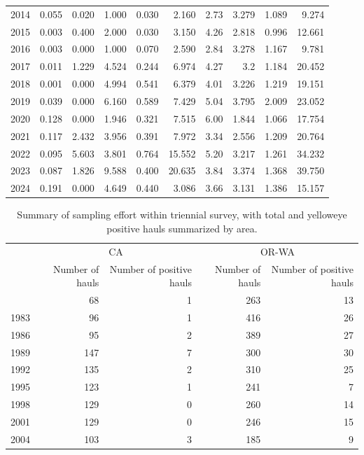 \documentclass[
]{scrartcl}
\begin{document}
\begin{landscape}
\begin{longtable}{rrrrrrrrrr}
2014 & 0.055 & 0.020 & 1.000 & 0.030 & 2.160 & 2.73 & 3.279 & 1.089 & 9.274 \\ 
2015 & 0.003 & 0.400 & 2.000 & 0.030 & 3.150 & 4.26 & 2.818 & 0.996 & 12.661 \\ 
2016 & 0.003 & 0.000 & 1.000 & 0.070 & 2.590 & 2.84 & 3.278 & 1.167 & 9.781 \\ 
2017 & 0.011 & 1.229 & 4.524 & 0.244 & 6.974 & 4.27 & 3.2 & 1.184 & 20.452 \\ 
2018 & 0.001 & 0.000 & 4.994 & 0.541 & 6.379 & 4.01 & 3.226 & 1.219 & 19.151 \\ 
2019 & 0.039 & 0.000 & 6.160 & 0.589 & 7.429 & 5.04 & 3.795 & 2.009 & 23.052 \\ 
2020 & 0.128 & 0.000 & 1.946 & 0.321 & 7.515 & 6.00 & 1.844 & 1.066 & 17.754 \\ 
2021 & 0.117 & 2.432 & 3.956 & 0.391 & 7.972 & 3.34 & 2.556 & 1.209 & 20.764 \\ 
2022 & 0.095 & 5.603 & 3.801 & 0.764 & 15.552 & 5.20 & 3.217 & 1.261 & 34.232 \\ 
2023 & 0.087 & 1.826 & 9.588 & 0.400 & 20.635 & 3.84 & 3.374 & 1.368 & 39.750 \\ 
2024 & 0.191 & 0.000 & 4.649 & 0.440 & 3.086 & 3.66 & 3.131 & 1.386 & 15.157 \\ 
\bottomrule

\end{longtable}

\endgroup

\end{landscape}

\newpage{}

\begingroup
\fontsize{9.0pt}{10.8pt}\selectfont

\begin{longtable}{l|rrrr}

\caption{\label{tbl-sampling-effort-triennial}Summary of sampling effort
within triennial survey, with total and yelloweye positive hauls
summarized by area.}

\tabularnewline

\toprule
 & \multicolumn{2}{c}{CA} & \multicolumn{2}{c}{OR-WA} \\ 
\cmidrule(lr){2-3} \cmidrule(lr){4-5}
 & Number of hauls & Number of positive hauls & Number of hauls & Number of positive hauls \\ 
\midrule\addlinespace[2.5pt]
1980 & 68 & 1 & 263 & 13 \\ 
1983 & 96 & 1 & 416 & 26 \\ 
1986 & 95 & 2 & 389 & 27 \\ 
1989 & 147 & 7 & 300 & 30 \\ 
1992 & 135 & 2 & 310 & 25 \\ 
1995 & 123 & 1 & 241 & 7 \\ 
1998 & 129 & 0 & 260 & 14 \\ 
2001 & 129 & 0 & 246 & 15 \\ 
2004 & 103 & 3 & 185 & 9 \\ 
\bottomrule

\end{longtable}
\end{document}
